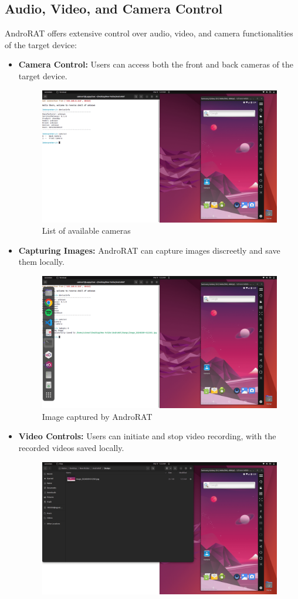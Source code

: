\documentclass[12pt]{article}
\begin{document}
\subsection{Audio, Video, and Camera Control}
AndroRAT offers extensive control over audio, video, and camera functionalities of the target device:
\begin{itemize}
    \item \textbf{Camera Control:} Users can access both the front and back cameras of the target device.
    \begin{figure}[h!]
      \centering
      \includegraphics[width=0.6\linewidth]{CAMlist.png}
      \caption{List of available cameras}
    \end{figure}
    \item \textbf{Capturing Images:} AndroRAT can capture images discreetly and save them locally.
    \begin{figure}[h!]
      \centering
      \includegraphics[width=0.6\linewidth]{PicTaken.png}
      \caption{Image captured by AndroRAT}
    \end{figure}
    \item \textbf{Video Controls:} Users can initiate and stop video recording, with the recorded videos saved locally.
    \begin{figure}[h!]
      \centering
      \includegraphics[width=0.6\linewidth]{picInDumps.png}

\end{figure}
\end{itemize}
\end{document}
